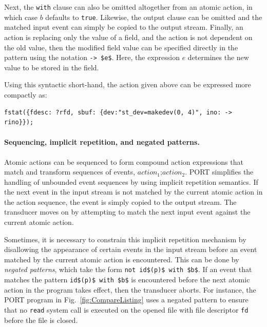 Next, the \lstinline+with+ clause can also be omitted altogether from an atomic action, in which case $b$ defaults to \lstinline+true+. Likewise, the output clause can be omitted and the matched input event can simply be copied to the output stream. Finally, an action is replacing only the value of a field, and the action is not dependent on the old value, then the modified field value can be specified directly in the pattern using the notation \lstinline+-> $e$+. Here, the expression $e$ determines the new value to be stored in the field.

Using this syntactic short-hand, the action given above can be expressed more compactly as:
\begin{lstlisting}[numbers=none,xleftmargin=0em,gobble=2]
  fstat({fdesc: ?rfd, sbuf: {dev:"st_dev=makedev(0, 4)", ino: -> rino}});
\end{lstlisting}


\paragraph*{Sequencing, implicit repetition, and negated patterns.}
Atomic actions can be sequenced to form compound action expressions that match and transform sequences of events, $\mathit{action}_1 \texttt{;} \mathit{action}_2$. PORT simplifies the handling of unbounded event sequences by using implicit repetition semantics.
If the next event in the input stream is not matched by the current atomic action in the action sequence, the event is simply copied to the output stream. The transducer moves on by attempting to match the next input event against the current atomic action.

Sometimes, it is necessary to constrain this implicit repetition mechanism by disallowing the appearance of certain events in the input stream before an event  matched by the current atomic action is encountered.  This can be done by \emph{negated patterns}, which take the form \lstinline+not id$(p)$ with $b$+. If an event that matches the pattern \lstinline+id$(p)$ with $b$+ is encountered before the next atomic action in the program takes effect, then the transducer aborts. For instance, the PORT program in Fig.~\ref{fig:CompareListing} uses a negated pattern to ensure that no \lstinline+read+ system call is executed on the opened file with file descriptor \lstinline+fd+ before the file is closed.

